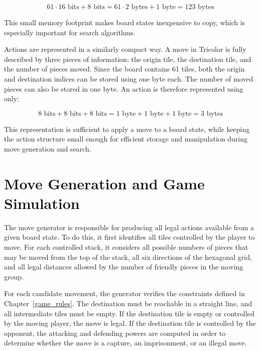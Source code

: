    \[ 61 \cdot 16 \text{ bits} + 8 \text{ bits} = 61 \cdot 2 \text{ bytes} + 1 \text{ byte} = 123 \text{ bytes}\]

This small memory footprint makes board states inexpensive to copy, which is especially important for search algorithms.

Actions are represented in a similarly compact way. A move in Tricolor is fully described by three pieces of information: the origin tile, the destination tile, and the number of pieces moved. Since the board contains 61 tiles, both the origin and destination indices can be stored using one byte each. The number of moved pieces can also be stored in one byte. An action is therefore represented using only:

   \[ 8 \text{ bits} + 8 \text{ bits} + 8 \text{ bits} = 1 \text{ byte} + 1 \text{ byte} + 1 \text{ byte} = 3 \text{ bytes} \]

This representation is sufficient to apply a move to a board state, while keeping the action structure small enough for efficient storage and manipulation during move generation and search.

\section{Move Generation and Game Simulation}

The move generator is responsible for producing all legal actions available from a given board state. To do this, it first identifies all tiles controlled by the player to move. For each controlled stack, it considers all possible numbers of pieces that may be moved from the top of the stack, all six directions of the hexagonal grid, and all legal distances allowed by the number of friendly pieces in the moving group.

For each candidate movement, the generator verifies the constraints defined in Chapter~\ref{game_rules}. The destination must be reachable in a straight line, and all intermediate tiles must be empty. If the destination tile is empty or controlled by the moving player, the move is legal. If the destination tile is controlled by the opponent, the attacking and defending powers are computed in order to determine whether the move is a capture, an imprisonment, or an illegal move.

